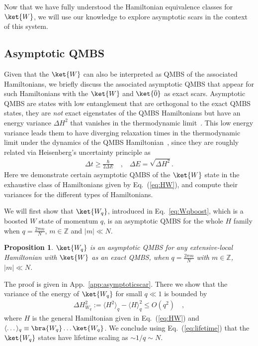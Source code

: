 \documentclass[prx,letterpaper,aps,superscriptaddress,floatfix,twocolumn,nofootinbib]{revtex4-2}
\newtheorem{prop}{Proposition}
\theoremstyle{definition}
\newcommand{\defn}{:=}
\begin{document}
%
Now that we have fully understood the Hamiltonian equivalence classes for $\ket{W}$, we will use our knowledge to explore asymptotic scars in the context of this system.
%

%
\subsection{Asymptotic QMBS}
\label{sec:asymptoticscars}
%
Given that the $\ket{W}$ can also be interpreted as QMBS of the associated Hamiltonians, we briefly discuss the associated asymptotic QMBS that appear for such Hamiltonians with the $\ket{W}$ and $\ket{\bar{0}}$ as exact scars. 
%
Asymptotic QMBS are states with low entanglement that are orthogonal to the exact QMBS states, they are \textit{not} exact eigenstates of the QMBS Hamiltonians but have an energy variance $\Delta H^2$ that vanishes in the thermodynamic limit~\cite{Gotta2023AsymptoticScars, Kunimi2023AsymptoticScarsDMI, Desaules2022SchwingerScars, Desaules2023weak}.
%
This low energy variance leads them to have diverging relaxation times in the thermodynamic limit under the dynamics of the QMBS Hamiltonian~\cite{Gotta2023AsymptoticScars, moudgalya2024symmetries}, since they are roughly related via Heisenberg's uncertainty principle as~\cite{PhysRevA.81.022113,Gotta2023AsymptoticScars}
    \begin{align}
         \Delta t \geq \frac{\hbar}{2\Delta E}\quad, \;\;\;\Delta E = \sqrt{\Delta H^2}.
    \label{eq:lifetime}
    \end{align}
Here we demonstrate certain asymptotic QMBS of the $\ket{W}$ state in the exhaustive class of Hamiltonians given by Eq.~(\ref{eq:HW}), and compute their variances for the different types of Hamiltonians.
%

%
We will first show that $\ket{W_q}$, introduced in Eq.~\eqref{eq:Wqboost}, which is a boosted $W$ state of momentum $q$, is an asymptotic QMBS for the whole $H$ family when $q = \frac{2\pi m}{N}$, $m \in \mathbb{Z}$ and $|m| \ll  N$.
%
\begin{prop}
\label{prop:asymptoticscar}
    $\ket{W_q}$ is an asymptotic QMBS for any extensive-local Hamiltonian with $\ket{W}$ as an exact QMBS, when $q = \frac{2\pi m}{N}$ with $m \in \mathbb{Z}$, $|m| \ll N$.
\end{prop}
The proof is given in App.~\ref{app:asymptoticscar}. 
%
There we show that the variance of the energy of $\ket{W_q}$ for small $q \ll 1$ is bounded by
    \begin{align}
        \Delta H_{W_q}^2 \defn \langle H^2 \rangle_q - \langle H \rangle_q^2 \leq O(q^2) \quad,
    \end{align}
    where $H$ is the general Hamiltonian given in Eq.~(\ref{eq:HW}) and $\langle \dots \rangle_q \equiv \bra{W_q} \dots \ket{W_q}$.
We conclude using Eq.~(\ref{eq:lifetime}) that the $\ket{W_q}$ states have lifetime scaling as $\sim 1/q \sim N$.
\end{document}
